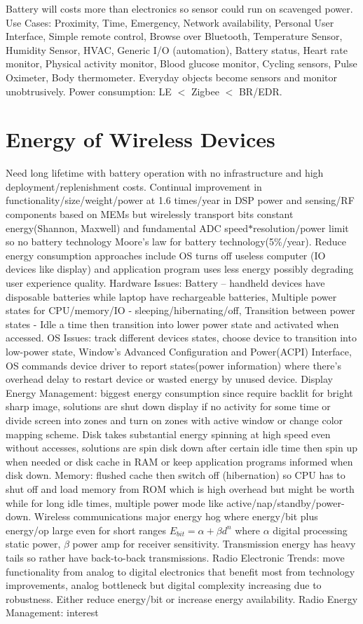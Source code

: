\documentclass[9pt]{extarticle}
\begin{document}
\begin{multicols}{2}
Battery will costs more than electronics so sensor could run on scavenged power. Use Cases: Proximity, Time, Emergency, Network availability, Personal User Interface, Simple remote control, Browse over Bluetooth, Temperature Sensor, Humidity Sensor, HVAC, Generic I/O (automation), Battery status, Heart rate monitor, Physical activity monitor, Blood glucose monitor, Cycling sensors, Pulse Oximeter, Body thermometer. Everyday objects become sensors and monitor unobtrusively. Power consumption: LE $<$ Zigbee $<$ BR/EDR.

\section{Energy of Wireless Devices}

Need long lifetime with battery operation with no infrastructure and high deployment/replenishment costs. Continual improvement in functionality/size/weight/power at 1.6 times/year in DSP power and sensing/RF components based on MEMs but wirelessly transport bits constant energy(Shannon, Maxwell) and fundamental ADC speed$*$resolution$/$power limit so no battery technology Moore’s law for battery technology(5$\%$/year). Reduce energy consumption approaches include OS turns off useless computer (IO devices like display) and application program uses less energy possibly degrading user experience quality. Hardware Issues: Battery – handheld devices have disposable batteries while laptop have rechargeable batteries, Multiple power states for CPU/memory/IO - sleeping/hibernating/off, Transition between power states - Idle a time then transition into lower power state and activated when accessed. OS Issues: track different devices states, choose device to transition into low-power state, Window's Advanced Configuration and Power(ACPI) Interface, OS commands device driver to report states(power information) where there's overhead delay to restart device or wasted energy by unused device. Display Energy Management: biggest energy consumption since require backlit for bright sharp image, solutions are shut down display if no activity for some time or divide screen into zones and turn on zones with active window or change color mapping scheme. Disk takes substantial energy spinning at high speed even without accesses,  solutions are spin disk down after certain idle time then spin up when needed or disk cache in RAM or keep application programs informed when disk down. Memory: flushed cache then switch off (hibernation) so CPU has to shut off and load memory from ROM which is high overhead but might be worth while for long idle times, multiple power mode like active/nap/standby/power-down. Wireless communications major energy hog where energy/bit plus energy/op large even for short ranges $E_{bit}=\alpha+\beta{d^n}$ where $\alpha$ digital processing static power, $\beta$ power amp for receiver sensitivity. Transmission energy has heavy tails so rather have back-to-back transmissions. Radio Electronic Trends: move functionality from analog to digital electronics that benefit most from technology improvements, analog bottleneck but digital complexity increasing due to robustness. Either reduce energy/bit or increase energy availability. Radio Energy Management: interest 
\end{multicols}
\end{document}
